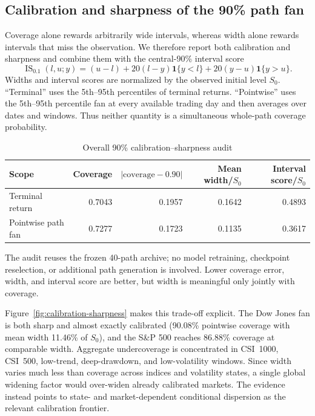 ﻿\documentclass[12pt,letterpaper]{article}
\newcommand{\tabnote}[1]{\begin{minipage}{\linewidth}\vspace{4pt}\footnotesize\singlespacing #1\end{minipage}}
\begin{document}
\subsection{Calibration and sharpness of the 90\% path fan}

Coverage alone rewards arbitrarily wide intervals, whereas width alone rewards
intervals that miss the observation. We therefore report both calibration and
sharpness \citep{gneiting2007calibration} and combine them with the
central-90\% interval score
\begin{equation}
\operatorname{IS}_{0.1}(l,u;y)=(u-l)
+20(l-y)\mathbf{1}\{y<l\}+20(y-u)\mathbf{1}\{y>u\}.
\end{equation}
Widths and interval scores are normalized by the observed initial level $S_0$.
``Terminal'' uses the 5th--95th percentiles of terminal returns. ``Pointwise''
uses the 5th--95th percentile fan at every available trading day and then
averages over dates and windows. Thus neither quantity is a simultaneous
whole-path coverage probability.

\begin{table}[ht]
\singlespacing
\centering
\caption{Overall 90\% calibration--sharpness audit}
\label{tab:calibration-overall}
\begin{tabular}{lrrrr}
\toprule
Scope & Coverage & $|\mathrm{coverage}-0.90|$ & Mean width/$S_0$ & Interval score/$S_0$ \\
\midrule
Terminal return & 0.7043 & 0.1957 & 0.1642 & 0.4893 \\
Pointwise path fan & 0.7277 & 0.1723 & 0.1135 & 0.3617 \\
\bottomrule
\end{tabular}
\tabnote{The audit reuses the frozen 40-path archive; no model retraining,
checkpoint reselection, or additional path generation is involved. Lower
coverage error, width, and interval score are better, but width is meaningful
only jointly with coverage.}
\end{table}

Figure~\ref{fig:calibration-sharpness} makes this trade-off explicit. The Dow
Jones fan is both sharp and almost exactly calibrated (90.08\% pointwise
coverage with mean width 11.46\% of $S_0$), and the S\&P 500 reaches 86.88\%
coverage at comparable width. Aggregate undercoverage is concentrated in
CSI~1000, CSI~500, low-trend, deep-drawdown, and low-volatility windows. Since
width varies much less than coverage across indices and volatility states, a
single global widening factor would over-widen already calibrated markets.
The evidence instead points to state- and market-dependent conditional
dispersion as the relevant calibration frontier.
\end{document}
